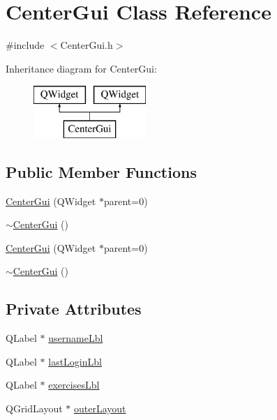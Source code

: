 \hypertarget{class_center_gui}{\section{Center\-Gui Class Reference}
\label{class_center_gui}
}


{\ttfamily \#include $<$Center\-Gui.\-h$>$}

Inheritance diagram for Center\-Gui\-:\begin{figure}[H]
\begin{center}
\leavevmode
\includegraphics[height=2.000000cm]{class_center_gui}
\end{center}
\end{figure}
\subsection*{Public Member Functions}
\begin{DoxyCompactItemize}
\item 
\hyperlink{class_center_gui_a7bcca579aa4926eec232cc151c96a4ab}{Center\-Gui} (Q\-Widget $\ast$parent=0)
\item 
\hyperlink{class_center_gui_a3f18faf32151a451a9fc258097dd7bdf}{$\sim$\-Center\-Gui} ()
\item 
\hyperlink{class_center_gui_a7bcca579aa4926eec232cc151c96a4ab}{Center\-Gui} (Q\-Widget $\ast$parent=0)
\item 
\hyperlink{class_center_gui_a3f18faf32151a451a9fc258097dd7bdf}{$\sim$\-Center\-Gui} ()
\end{DoxyCompactItemize}
\subsection*{Private Attributes}
\begin{DoxyCompactItemize}
\item 
Q\-Label $\ast$ \hyperlink{class_center_gui_a28898f20d373a0a9b78e000d363f1ec8}{username\-Lbl}
\item 
Q\-Label $\ast$ \hyperlink{class_center_gui_ad705821fb728b7c2b091c55525963cdf}{last\-Login\-Lbl}
\item 
Q\-Label $\ast$ \hyperlink{class_center_gui_aa90cf9a91c5dc7d115dba1db8ffe517a}{exercises\-Lbl}
\item 
Q\-Grid\-Layout $\ast$ \hyperlink{class_center_gui_af7a9e302c0dca4febe804c9a1a9d2dd7}{outer\-Layout}
\end{DoxyCompactItemize}


